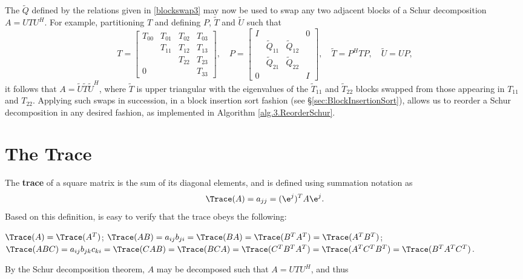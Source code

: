 The $\tilde Q$ defined by the relations given in \eqref{blockswap3} may now be used to swap any two adjacent blocks of a Schur decomposition $A=U T U^H$.
For example, partitioning $T$ and defining $P$, $\tilde T$ and $\tilde U$ such that
\begin{equation*}
T=\begin{bmatrix} T_{00} & T_{01} & T_{02} & T_{03} \\  & T_{11} & T_{12} & T_{13} \\ &  & T_{22} & T_{23} \\ 0 &  &  & T_{33} \end{bmatrix}, \quad
P=\begin{bmatrix} I & &  & 0 \\ & \tilde Q_{11} & \tilde Q_{12} & \\ & \tilde Q_{21} & \tilde Q_{22} & \\ 0 & & & I \end{bmatrix}, \quad
\tilde T=P^H T P, \quad \tilde U=U P,
\end{equation*}
it follows that $A=\tilde U \tilde T \tilde U^H$, where $\tilde T$ is upper triangular with the eigenvalues of the $\tilde T_{11}$ and $\tilde T_{22}$ blocks swapped from those
appearing in $T_{11}$ and $T_{22}$.
Applying such swaps in succession, in a block insertion sort fashion (see \S \ref{sec:BlockInsertionSort}),
allows us to reorder a Schur decomposition in any desired fashion, as implemented in Algorithm \ref{alg.3.ReorderSchur}. 

\section{The Trace}\label{sec.A.F.A}

The {\bf trace} of a square matrix is the sum of its diagonal elements, and is defined using summation notation as
\begin{equation*}
    \Trace(A)= a_{jj} = (\e^j)^T A \e^j.
\end{equation*}
Based on this definition,  is easy to verify that the trace obeys the following:

\begin{fact} \label{fact.A.F.A.a}
$\Trace(A)=\Trace(A^T)$;\quad
$\Trace(AB)= a_{ij} b_{ji} = \Trace(BA) = \Trace(B^T A^T) = \Trace(A^T B^T)$;\hfill\break
$\Trace(ABC)= a_{ij} b_{jk} c_{ki} =\Trace(CAB)=\Trace(BCA)=\Trace(C^T B^T A^T)=\Trace( A^T C^T B^T)=\Trace(B^T A^T C^T)$.
\end{fact}

\noindent By the Schur decomposition theorem, $A$ may be decomposed
such that $A=UTU^{H}$, and thus

